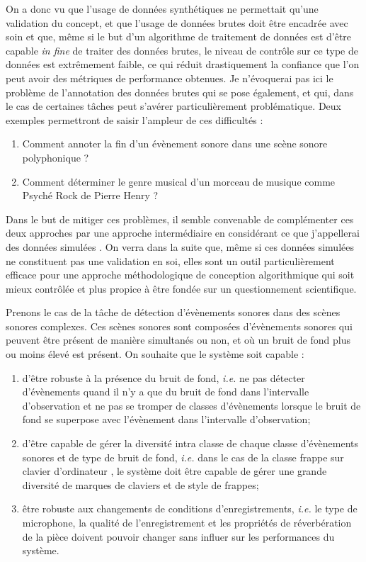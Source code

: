 On a donc vu que l'usage de données synthétiques ne permettait qu'une validation du concept, et que l'usage de données brutes doit être encadrée avec soin et que, même si le but d'un algorithme de traitement de données est d'être capable \textit{in fine} de traiter des données brutes, le niveau de contrôle sur ce type de données est extrêmement faible, ce qui réduit drastiquement la confiance que l'on peut avoir des métriques de performance obtenues. Je n'évoquerai pas ici le problème de l'annotation des données brutes qui se pose également, et qui, dans le cas de certaines tâches peut s'avérer particulièrement problématique. Deux exemples permettront de saisir l'ampleur de ces difficultés :
\begin{enumerate}
  \item Comment annoter la fin d'un évènement sonore dans une scène sonore polyphonique ?
  \item  Comment déterminer le genre musical d'un morceau de musique comme \og Psyché Rock \fg de Pierre Henry ?
\end{enumerate}

Dans le but de mitiger ces problèmes, il semble convenable de complémenter ces deux approches par une approche intermédiaire en considérant ce que j'appellerai des données \og simulées \fg. On verra dans la suite que, même si ces données simulées ne constituent pas une validation en soi, elles sont un outil particulièrement efficace pour une approche méthodologique de conception algorithmique qui soit mieux contrôlée et plus propice à être fondée sur un questionnement scientifique.

Prenons le cas de la tâche de détection d'évènements sonores dans des scènes sonores complexes. Ces scènes sonores sont composées d'évènements sonores qui peuvent être présent de manière simultanés ou non, et où un bruit de fond plus ou moins élevé est présent. On souhaite que le système soit capable :
\begin{enumerate}
  \item d'être robuste à la présence du bruit de fond, \textit{i.e.} ne pas détecter d'évènements quand il n'y a que du bruit de fond dans l'intervalle d'observation et ne pas se tromper de classes d'évènements lorsque le bruit de fond se superpose avec l'évènement  dans l'intervalle d'observation;
  \item d'être capable de gérer la diversité intra classe de chaque classe d'évènements sonores et de type de bruit de fond,  \textit{i.e.} dans le cas de la classe \og frappe sur clavier d'ordinateur \fg, le système doit être capable de gérer une grande diversité de marques de claviers et de style de frappes;
  \item être robuste aux changements de conditions d'enregistrements,  \textit{i.e.} le type de microphone, la qualité de l'enregistrement et les propriétés de réverbération de la pièce doivent pouvoir changer sans influer sur les performances du système.
\end{enumerate}

